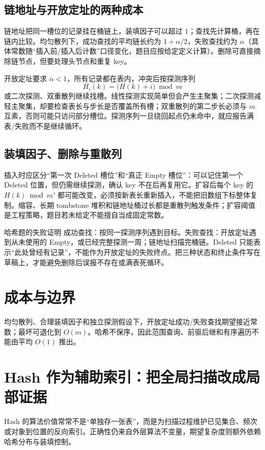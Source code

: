 \documentclass[UTF8,fontset=none,11pt,a4paper]{ctexart}
\begin{document}
\subsection{链地址与开放定址的两种成本}
链地址把同一槽位的记录挂在桶链上，装填因子可以超过 $1$；查找先计算桶，再在链内比较。均匀散列下，成功查找的平均链长约为 $1+\alpha/2$，失败查找约为 $\alpha$（具体常数随“插入前/插入后计数”口径变化，题目应按给定定义计算）。删除可直接摘除链节点，但要处理头节点和重复 key。

开放定址要求 $\alpha<1$，所有记录都在表内，冲突后按探测序列
\[
H_i(k)=\bigl(H(k)+i\bigr)\bmod m
\]
或二次探测、双重散列继续找槽。线性探测实现简单但会产生主聚集；二次探测减轻主聚集，却要检查表长与步长是否覆盖所有槽；双重散列的第二步长必须与 $m$ 互素，否则可能只访问部分槽位。探测序列一旦绕回起点仍未命中，就应报告满表/失败而不是继续循环。

\subsection{装填因子、删除与重散列}
插入时应区分“第一次 Deleted 槽位”和“真正 Empty 槽位”：可以记住第一个 Deleted 位置，但仍需继续探测，确认 key 不在后再复用它。扩容后每个 key 的 $H(k)\bmod m'$ 都可能改变，必须按新表长重新插入，不能把旧数组下标整体复制。缩容、长期 tombstone 堆积和链地址桶过长都是重散列触发条件；扩容阈值是工程策略，题目若未给定不能擅自当成固定常数。

\begin{methodbox}{哈希题的失败证明}
成功查找：按同一探测序列遇到目标。失败查找：开放定址遇到从未使用的 Empty，或已经完整探测一周；链地址扫描完桶链。Deleted 只能表示“此处曾经有记录”，不能作为开放定址的失败终点。把三种状态和终止条件写在草稿上，才能避免删除后误报不存在或满表死循环。
\end{methodbox}

\section{成本与边界}
均匀散列、合理装填因子和独立探测假设下，开放定址成功/失败查找期望接近常数；最坏可退化到 $O(m)$。哈希不保序，因此范围查询、前驱后继和有序遍历不能由平均 $O(1)$ 推出。

\section{Hash 作为辅助索引：把全局扫描改成局部证据}
Hash 的算法价值常常不是“单独存一张表”，而是为扫描过程维护已见集合、频次或对象到位置的反向索引。正确性仍来自外层算法不变量，期望复杂度则额外依赖哈希分布与装填控制。
\end{document}
